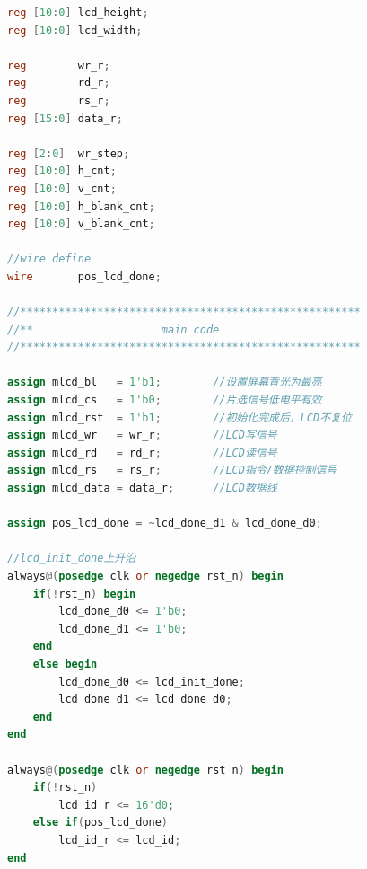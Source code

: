 \documentclass[12pt,hyperref,a4paper,UTF8]{ctexart}
\begin{document}
\begin{lstlisting}[language=Verilog]
reg [10:0] lcd_height;
reg [10:0] lcd_width;

reg        wr_r; 
reg        rd_r;
reg        rs_r;
reg [15:0] data_r;

reg [2:0]  wr_step;
reg [10:0] h_cnt;
reg [10:0] v_cnt; 
reg [10:0] h_blank_cnt;
reg [10:0] v_blank_cnt;

//wire define
wire       pos_lcd_done;

//*****************************************************
//**                    main code
//*****************************************************  

assign mlcd_bl   = 1'b1;        //设置屏幕背光为最亮
assign mlcd_cs   = 1'b0;        //片选信号低电平有效
assign mlcd_rst  = 1'b1;        //初始化完成后，LCD不复位
assign mlcd_wr   = wr_r;        //LCD写信号
assign mlcd_rd   = rd_r;        //LCD读信号
assign mlcd_rs   = rs_r;        //LCD指令/数据控制信号
assign mlcd_data = data_r;      //LCD数据线

assign pos_lcd_done = ~lcd_done_d1 & lcd_done_d0;

//lcd_init_done上升沿
always@(posedge clk or negedge rst_n) begin
    if(!rst_n) begin
        lcd_done_d0 <= 1'b0;
        lcd_done_d1 <= 1'b0;
    end
    else begin
        lcd_done_d0 <= lcd_init_done;
        lcd_done_d1 <= lcd_done_d0;
    end        
end    

always@(posedge clk or negedge rst_n) begin
    if(!rst_n) 
        lcd_id_r <= 16'd0;
    else if(pos_lcd_done)
        lcd_id_r <= lcd_id;
end


\end{lstlisting}
\end{document}
